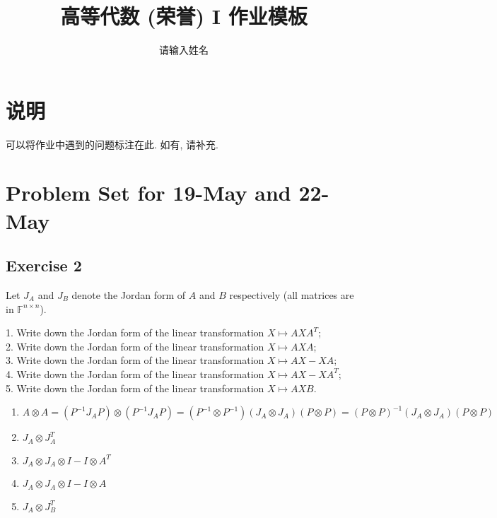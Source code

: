 \documentclass[11pt]{ctexart}
\title{高等代数 (荣誉) I 作业模板}
\author{请输入姓名}
\theoremstyle{definition}
\numberwithin{equation}{section}
\theoremstyle{definition}
\theoremstyle{remark}
\begin{document}
\maketitle

\section{说明}

可以将作业中遇到的问题标注在此. 如有, 请补充.

\tableofcontents

\newpage


\section{Problem Set for 19-May and 22-May}
\subsection{Exercise 2}
Let $J_A$ and $J_B$ denote the Jordan form of $A$ and $B$ respectively (all matrices are in $\mathbb F^{n \times n}$).

1. Write down the Jordan form of the linear transformation $X \mapsto AXA^T$;\\
2. Write down the Jordan form of the linear transformation $X \mapsto AXA$;\\
3. Write down the Jordan form of the linear transformation $X \mapsto AX - XA$; \\
4. Write down the Jordan form of the linear transformation $X \mapsto AX - XA^T$;\\
5. Write down the Jordan form of the linear transformation $X \mapsto AXB$.
\begin{aaa}
    \begin{enumerate}
        \item $A\otimes A=(P^{-1}J_AP)\otimes(P^{-1}J_AP)=(P^{-1}\otimes P^{-1})(J_A\otimes J_A)(P\otimes P)=(P\otimes P)^{-1}(J_A\otimes J_A)(P\otimes P)$\\
        \item $J_A\otimes J_A^T$
        \item $J_A\otimes J_A\otimes I-I\otimes A^T$
        \item $J_A\otimes J_A\otimes I-I\otimes A$
        \item $J_A\otimes J_B^T$
    \end{enumerate}
\end{aaa}
\end{document}
